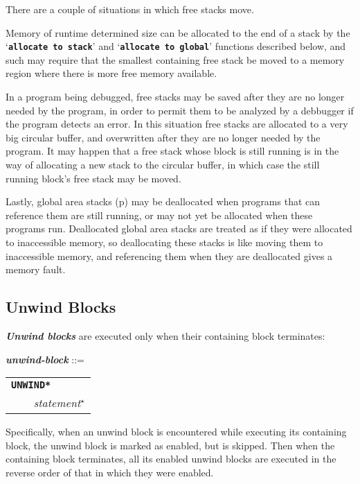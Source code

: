 \documentclass[12pt]{article}
\makeatletter
\newcommand{\TT}[1]{{\tt \bfseries #1}}
\newcommand{\ikey}[2]{{\bf \em #1}\index{#2}}
\newcommand{\ttkey}[1]{\TT{#1}\index{#1@{\tt #1}}}
\newcommand{\emkey}[1]{{\bf \em #1}\index{#1@{\em #1}}}
\newcommand{\pagref}[1]{p\pageref{#1}}
\newcommand{\STAR}{{\Large $^\star$}}
\newenvironment{indpar}[1][0.3in]%
	{\begin{list}{}%
		     {\setlength{\itemsep}{0in}%
		      \setlength{\topsep}{0in}%
		      \setlength{\parsep}{1ex}%
		      \setlength{\labelwidth}{#1}%
		      \setlength{\leftmargin}{#1}%
		      \addtolength{\leftmargin}{\labelsep}}%
	 \item}%
	{\end{list}}
\makeatother
\begin{document}
There are a couple of situations in which free stacks move.

Memory of runtime determined size can be allocated to the end of
a stack by the `\TT{allocate to stack}' and `\TT{allocate to global}'
functions described below, and such may
require that the smallest containing free stack
be moved to a memory region where there is more free memory available.

In a program being debugged, free stacks may be saved after they are no
longer needed by the program, in order to permit them to be analyzed
by a debbugger if the program detects an error.  In this situation
free stacks are allocated to a very big circular buffer, and overwritten
after they are no longer needed by the program.  It may happen that
a free stack whose block is still running is in the way of allocating
a new stack to the circular buffer, in which case the still running
block's free stack may be moved.

Lastly, global area stacks (\pagref{GLOBAL-AREAS})
may be deallocated when programs that
can reference them are still running, or may not yet be allocated
when these programs run.  Deallocated global area stacks are treated as if
they were allocated to inaccessible memory, so deallocating these stacks
is like moving them to inaccessible memory, and referencing
them when they are deallocated gives a memory fault.


\subsection{Unwind Blocks}
\label{UNWIND-BLOCKS}

\ikey{Unwind blocks}{unwind block} are executed only when their
containing block terminates:

\begin{indpar}
\emkey{unwind-block}
    ::= \begin{tabular}[t]{l}
	\ttkey{*UNWIND*}\TT{:} \\
	\TT{~~~~}{\em statement}\STAR{} \\
	\end{tabular}
\end{indpar}

Specifically, when an unwind block is encountered while
executing its containing block, the unwind block is marked
as enabled, but is skipped.  Then when the containing block
terminates, all its enabled unwind blocks are executed in
the reverse order of that in which they were enabled.
\end{document}

